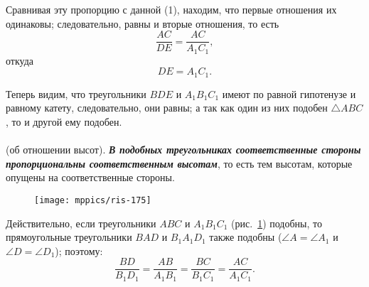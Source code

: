 Сравнивая эту пропорцию с данной (1), находим, что первые отношения их одинаковы;
следовательно, равны и вторые отношения, то есть 
\[\frac{AC}{DE}=\frac{AC}{A_1C_1},\]
откуда
\[DE=A_1C_1.\]

Теперь видим, что треугольники $BDE$ и $A_1B_1C_1$ имеют по равной гипотенузе и равному катету, следовательно, они равны;
а так как один из них подобен $\triangle ABC$, то и другой ему подобен.

\paragraph{}\label{1938/165}
 (об отношении высот).
\textbf{\emph{В подобных треугольниках соответственные стороны пропорциональны соответственным высотам}}, то есть тем высотам, которые опущены на соответственные стороны.

\begin{figure}[!ht]
\centering
\texttt{[image: mppics/ris-175]}
\caption{}\label{1938/ris-175}
\end{figure}


Действительно, если треугольники $ABC$ и $A_1B_1C_1$ (рис.~\ref{1938/ris-175}) подобны, то прямоугольные треугольники $BAD$ и $B_1A_1D_1$ также подобны ($\angle A = \angle A_1$ и $\angle D=\angle D_1$);
поэтому:
\[\frac{BD}{B_1D_1}=\frac{AB}{A_1B_1}=\frac{BC}{B_1C_1}=\frac{AC}{A_1C_1}.\]
